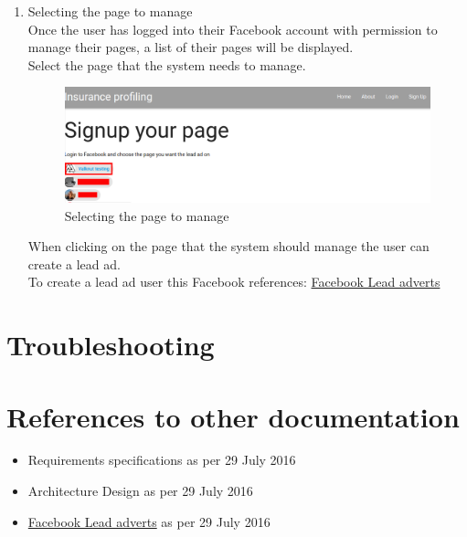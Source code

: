 \documentclass{article}
\begin{document}
\begin{enumerate}
			\item Selecting the page to manage\\
				Once the user has logged into their Facebook account with permission to manage their pages, a list of their pages will be displayed.\\
				Select the page that the system needs to manage.\\
				\begin{figure}[H]
				  \centering
				      \includegraphics[width=\textwidth]{images/select_page.png}
				  \caption{Selecting the page to manage}
				  \label{fig:selectPage}
				\end{figure}
				When clicking on the page that the system should manage the user can create a lead ad.\\
				To create a lead ad user this Facebook references: \href{https://www.facebook.com/business/a/lead-ads}{Facebook Lead adverts}
			\end{enumerate}
	
	\section{Troubleshooting}

	\section{References to other documentation}
		\begin{itemize}
			\item{Requirements specifications as per 29 July 2016}
			\item{Architecture Design as per 29 July 2016}
			\item{\href{https://www.facebook.com/business/a/lead-ads}{Facebook Lead adverts} as per 29 July 2016}
		\end{itemize}
\end{document}
